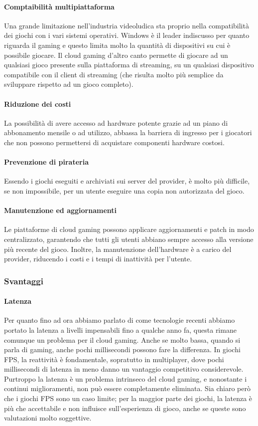 \documentclass[12pt,a4paper,openright,twoside]{book}
\begin{document}
\paragraph{Comptaibilità multipiattaforma} Una grande limitazione nell'industria videoludica sta proprio nella compatibilità dei giochi con i vari sistemi operativi. Windows è il leader indiscusso per quanto riguarda il gaming e questo limita molto la quantità di dispositivi su cui è possibile giocare. Il cloud gaming d'altro canto permette di giocare ad un qualsiasi gioco presente sulla piattaforma di streaming, su un qualsiasi dispositivo compatibile con il client di streaming (che risulta molto più semplice da sviluppare rispetto ad un gioco completo).
\paragraph{Riduzione dei costi} La possibilità di avere accesso ad hardware potente grazie ad un piano di abbonamento mensile o ad utilizzo, abbassa la barriera di ingresso per i giocatori che non possono permettersi di acquistare componenti hardware costosi.
\paragraph{Prevenzione di pirateria} Essendo i giochi eseguiti e archiviati sui server del provider, è molto più difficile, se non impossibile, per un utente eseguire una copia non autorizzata del gioco.
\paragraph{Manutenzione ed aggiornamenti} Le piattaforme di cloud gaming possono applicare aggiornamenti e patch in modo centralizzato, garantendo che tutti gli utenti abbiano sempre accesso alla versione più recente del gioco. Inoltre, la manutenzione dell'hardware è a carico del provider, riducendo i costi e i tempi di inattività per l'utente.

\subsubsection{Svantaggi}
\paragraph{Latenza} Per quanto fino ad ora abbiamo parlato di come tecnologie recenti abbiamo portato la latenza a livelli impensabili fino a qualche anno fa, questa rimane comunque un problema per il cloud gaming. Anche se molto bassa, quando si parla di gaming, anche pochi millisecondi possono fare la differenza. In giochi \ac{FPS}, la reattività è fondamentale, sopratutto in multiplayer, dove pochi millisecondi di latenza in meno danno un vantaggio competitivo considerevole. Purtroppo la latenza è un problema intrinseco del cloud gaming, e nonostante i continui miglioramenti, non può essere completamente eliminata. Sia chiaro però che i giochi \ac{FPS} sono un caso limite; per la maggior parte dei giochi, la latenza è più che accettabile e non influisce sull'esperienza di gioco, anche se queste sono valutazioni molto soggettive.
\end{document}
